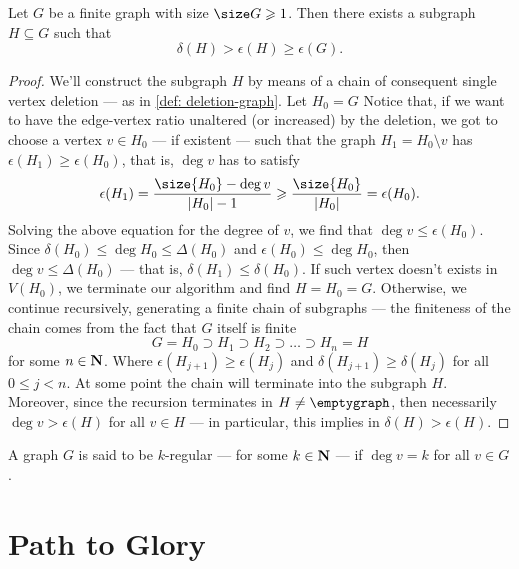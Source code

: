 \begin{proposition}\label{prop: edge-dense-subgraph}
  Let \(G\) be a finite graph with size \(\size G \geq 1\). Then there exists a
  subgraph \(H \subseteq G\) such that
  \[
    \delta(H) > \epsilon(H) \geq \epsilon(G).
  \]
\end{proposition}

\begin{proof}
  We'll construct the subgraph \(H\) by means of a chain of consequent single
  vertex deletion --- as in \cref{def: deletion-graph}. Let \(H_0 = G\) Notice
  that, if we want to have the edge-vertex ratio unaltered (or increased) by the
  deletion, we got to choose a vertex \(v \in H_0\) --- if existent --- such
  that the graph \(H_1 = H_0 \setminus v\) has \(\epsilon(H_1) \geq
  \epsilon(H_0)\), that is, \(\deg v\) has to satisfy
  \[
    \epsilon(H_1) = \frac{\size{H_0} - \deg v}{|H_0| - 1}
    \geq \frac{\size{H_0}}{|H_0|} = \epsilon(H_0).
  \]
  Solving the above equation for the degree of \(v\), we find that \(\deg v \leq
  \epsilon(H_0)\). Since \(\delta(H_0) \leq \deg H_0 \leq \Delta(H_0)\) and
  \(\epsilon(H_0) \leq \deg H_0\), then \(\deg v \leq \Delta(H_0)\) --- that is,
  \(\delta(H_1) \leq \delta(H_0)\). If such vertex doesn't exists in \(V(H_0)\),
  we terminate our algorithm and find \(H = H_0 = G\). Otherwise, we continue
  recursively, generating a finite chain of subgraphs --- the finiteness of the
  chain comes from the fact that \(G\) itself is finite
  \[
    G = H_0 \supset H_1 \supset H_2 \supset \dots \supset H_n = H
  \]
  for some \(n \in \mathbf{N}\). Where \(\epsilon(H_{j+1}) \geq \epsilon(H_j)\) and
  \(\delta(H_{j+1}) \geq \delta(H_j)\) for all \(0 \leq j < n\). At some point
  the chain will terminate into the subgraph \(H\). Moreover, since the
  recursion terminates in \(H \neq \emptygraph\), then necessarily \(\deg v >
  \epsilon(H)\) for all \(v \in H\) --- in particular, this implies in
  \(\delta(H) > \epsilon(H)\).
\end{proof}

\begin{definition}\label{def: k-regular}
  A graph \(G\) is said to be \(k\)-regular --- for some \(k \in \mathbf{N}\) --- if
  \(\deg v = k\) for all \(v \in G\).
\end{definition}

\section{Path to Glory}

